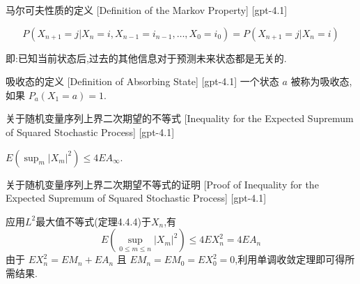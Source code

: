 \documentclass[UTF8]{ctexart}
\begin{document}
    
    
    \begin{dfn}
        {马尔可夫性质的定义}
        [Definition of the Markov Property]
        [gpt-4.1]
        
\[
P ( X _ { n + 1 } = j | X _ { n } = i , X _ { n - 1 } = i _ { n - 1 } , \dots , X _ { 0 } = i _ { 0 } ) = P ( X _ { n + 1 } = j | X _ { n } = i )
\]

即:已知当前状态后,过去的其他信息对于预测未来状态都是无关的.

    \end{dfn}
    
    
    
    \begin{dfn}
        {吸收态的定义}
        [Definition of Absorbing State]
        [gpt-4.1]
        一个状态 $a$ 被称为吸收态,如果 $P _ { a } ( X _ { 1 } = a ) = 1$.
    \end{dfn}
    
    
    
    \begin{thm}
        {关于随机变量序列上界二次期望的不等式}
        [Inequality for the Expected Supremum of Squared Stochastic Process]
        [gpt-4.1]
        
$E \left( \operatorname* { sup } _ { m } | X _ { m } | ^ { 2 } \right) \leq 4 E A _ { \infty }.$

    \end{thm}
    
    
    
    \begin{prf}
        {关于随机变量序列上界二次期望不等式的证明}
        [Proof of Inequality for the Expected Supremum of Squared Stochastic Process]
        [gpt-4.1]
        
应用$L^2$最大值不等式(定理4.4.4)于$X_n$,有
\[
E \left( \operatorname* { sup } _ { 0 \leq m \leq n } | X _ { m } | ^ { 2 } \right) \leq 4 E X _ { n } ^ { 2 } = 4 E A _ { n }
\]
由于 $E X _ { n } ^ { 2 } = E M _ { n } + E A _ { n }$ 且 $E M _ { n } = E M _ { 0 } = E X _ { 0 } ^ { 2 } = 0$,利用单调收敛定理即可得所需结果.

    \end{prf}
    
    
    
\end{document}
